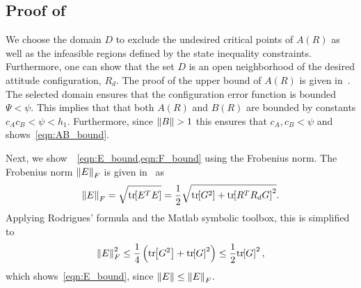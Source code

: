 \documentclass[10pt,fleqn]{IJCAS}  %
\begin{document}
\begin{multicols}{2}
\subsection{Proof of~}\label{proof:eR_dot_bound}
We choose the domain \( D \) to exclude the undesired critical points of \( A(R) \) as well as the infeasible regions defined by the state inequality constraints. 
Furthermore, one can show that the set \( D \) is an open neighborhood of the desired attitude configuration, \( R_d\).
The proof of the upper bound of \( A(R) \) is given in~\cite{LeeITCST13}.
The selected domain ensures that the configuration error function is bounded \( \Psi < \psi \).
This implies that that both \( A(R) \) and \( B(R) \) are bounded by constants \( c_A c_B < \psi < h_1\).
Furthermore, since \( \left\| B \right\| > 1 \) this ensures that \( c_A, c_B < \psi\) and shows~\cref{eqn:AB_bound}.

Next, we show~~\cref{eqn:E_bound,eqn:F_bound} using the Frobenius norm.
The Frobenius norm \( \left\| E \right\|_F \) is given in~\cite{LeeITCST13} as
\begin{gather*}
	\left\| E \right\|_F = \sqrt{\mathrm{tr}\negthickspace\left[ E^T E \right]} = \frac{1}{2} \sqrt{\mathrm{tr}\negthickspace\left[ G^2 \right] + \mathrm{tr}\negthickspace\left[ R^T R_d G \right]^2} .
\end{gather*}
Applying Rodrigues' formula and the Matlab symbolic toolbox, this is simplified to
\begin{gather*}
	\left\| E \right\|^2_F \leq \frac{1}{4} \left( \mathrm{tr}\negthickspace\left[ G^2 \right] + \mathrm{tr}\negthickspace\left[ G \right]^2 \right) \leq \frac{1}{2} \mathrm{tr}\negthickspace\left[ G \right]^2 ,
\end{gather*}
which shows~\cref{eqn:E_bound}, since \( \left\| E \right\| \leq \left\| E \right\|_F \).


\end{multicols}
\end{document}
